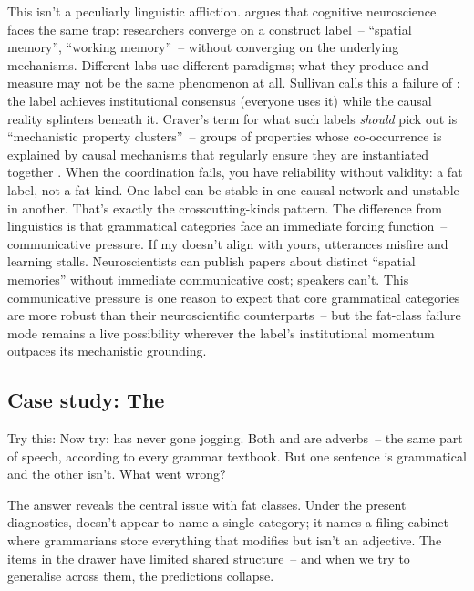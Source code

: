 This isn't a peculiarly linguistic affliction. \textcite{Sullivan2016} argues that cognitive neuroscience faces the same trap: researchers converge on a construct label~-- \enquote{spatial memory}, \enquote{working memory}~-- without converging on the underlying mechanisms. Different labs use different paradigms; what they produce and measure may not be the same phenomenon at all. Sullivan calls this a failure of : the label achieves institutional consensus (everyone uses it) while the causal reality splinters beneath it. Craver's term for what such labels \emph{should} pick out is \enquote{mechanistic property clusters}~-- groups of properties whose co-occurrence is explained by causal mechanisms that regularly ensure they are instantiated together \autocite{craver2009}. When the coordination fails, you have reliability without validity: a fat label, not a fat kind. One label can be stable in one causal network and unstable in another. That's exactly the crosscutting-kinds pattern. The difference from linguistics is that grammatical categories face an immediate forcing function~-- communicative pressure. If my  doesn't align with yours, utterances misfire and learning stalls. Neuroscientists can publish papers about distinct \enquote{spatial memories} without immediate communicative cost; speakers can't. This communicative pressure is one reason to expect that core grammatical categories are more robust than their neuroscientific counterparts~-- but the fat-class failure mode remains a live possibility wherever the label's institutional momentum outpaces its mechanistic grounding.

\subsection{Case study: The }
\label{sec:8:adverb}

Try this:  Now try: \ungram{}  has never gone jogging. Both  and  are adverbs~-- the same part of speech, according to every grammar textbook. But one sentence is grammatical and the other isn't. What went wrong?

The answer reveals the central issue with fat classes. Under the present diagnostics,  doesn't appear to name a single category; it names a filing cabinet where grammarians store everything that modifies but isn't an adjective. The items in the drawer have limited shared structure~-- and when we try to generalise across them, the predictions collapse.

